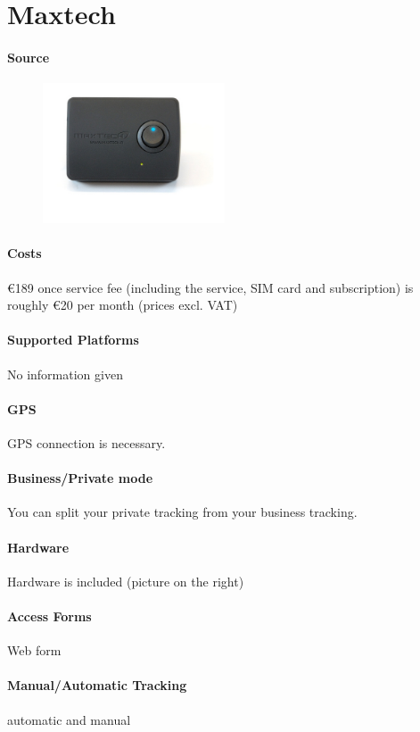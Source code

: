 \section{Maxtech}
\paragraph{Source} 
\begin{figure}
  \begin{center}
    \includegraphics[width=0.48\textwidth]{logbook}
  \end{center}
\end{figure}
\paragraph{Costs} \euro 189 once
service fee (including the service, SIM card and subscription) is roughly \euro 20 per month (prices excl. VAT)
\paragraph{Supported Platforms} No information given
\paragraph{GPS} GPS connection is necessary.
\paragraph{Business/Private mode}You can split your private tracking from your business tracking.
\paragraph{Hardware}Hardware is included (picture on the right)
\paragraph{Access Forms}Web form
\paragraph{Manual/Automatic Tracking}automatic and manual
